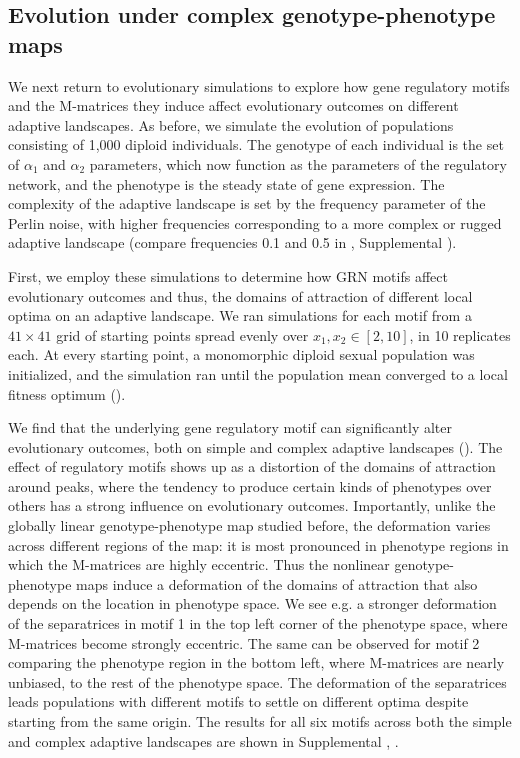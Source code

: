 \subsection{Evolution under complex genotype-phenotype maps}

We next return to evolutionary simulations to explore how gene regulatory motifs and the M-matrices they induce affect evolutionary outcomes on different adaptive landscapes.
As before, we simulate the evolution of populations consisting of 1,000 diploid individuals.
The genotype of each individual is the set of $\alpha_1$ and $\alpha_2$ parameters, which now function as the parameters of the regulatory network, and the phenotype is the steady state of gene expression.
The complexity of the adaptive landscape is set by the frequency parameter of the Perlin noise, with higher frequencies corresponding to a more complex or rugged adaptive landscape (compare frequencies 0.1 and 0.5 in , Supplemental ).

First, we employ these simulations to determine how GRN motifs affect evolutionary outcomes and thus, the domains of attraction of different local optima on an adaptive landscape.
We ran simulations for each motif from a $41 \times 41$ grid of starting points spread evenly over $x_1, x_2 \in [2, 10]$, in 10 replicates each.
At every starting point, a monomorphic diploid sexual population was initialized, and the simulation ran until the population mean converged to a local fitness optimum ().

We find that the underlying gene regulatory motif can significantly alter evolutionary outcomes, both on simple and complex adaptive landscapes ().
The effect of regulatory motifs shows up as a distortion of the domains of attraction around peaks, where the tendency to produce certain kinds of phenotypes over others has a strong influence on evolutionary outcomes.
Importantly, unlike the globally linear genotype-phenotype map studied before, the deformation varies across different regions of the map: it is most pronounced in phenotype regions in which the M-matrices are highly eccentric.
Thus the nonlinear genotype-phenotype maps induce a deformation of the domains of attraction that also depends on the location in phenotype space.
We see e.g. a stronger deformation of the separatrices in motif 1 in the top left corner of the phenotype space, where M-matrices become strongly eccentric.
The same can be observed for motif 2 comparing the phenotype region in the bottom left, where M-matrices are nearly unbiased, to the rest of the phenotype space.
The deformation of the separatrices leads populations with different motifs to settle on different optima despite starting from the same origin.
The results for all six motifs across both the simple and complex adaptive landscapes are shown in Supplemental , .

